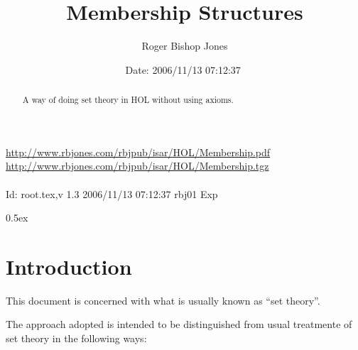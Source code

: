 \documentclass[11pt,a4paper]{article}
\begin{document}
\title{Membership Structures}
\author{Roger Bishop Jones}
\date{$ $Date: 2006/11/13 07:12:37 $ $}
\maketitle

\begin{abstract}
A way of doing set theory in HOL without using axioms.
\end{abstract}

\vfill
\begin{centering}
{\footnotesize
\href{http://www.rbjones.com/rbjpub/isar/HOL/Membership.pdf}{http://www.rbjones.com/rbjpub/isar/HOL/Membership.pdf}\\
\href{http://www.rbjones.com/rbjpub/isar/HOL/Membership.tgz}{http://www.rbjones.com/rbjpub/isar/HOL/Membership.tgz}\\
\ \\
$ $Id: root.tex,v 1.3 2006/11/13 07:12:37 rbj01 Exp $ $\\
}%
\end{centering}

\newpage

\tableofcontents

\parindent 0pt\parskip 0.5ex

\section{Introduction}

This document is concerned with what is usually known as ``set theory''.

The approach adopted is intended to be distinguished from usual treatmente of set theory in the following ways:
\end{document}
